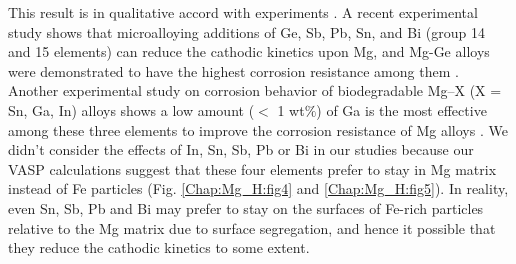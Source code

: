 This result is in qualitative accord with experiments \cite{liu2016controlling,birbilis2014evidence}. A recent experimental study shows that microalloying additions of Ge, Sb, Pb, Sn, and Bi (group 14 and 15 elements) can reduce the cathodic kinetics upon Mg, and Mg-Ge alloys were demonstrated to have the highest corrosion resistance among them \cite{liu2018simultaneously}. Another experimental study on corrosion behavior of biodegradable Mg–X (X = Sn, Ga, In) alloys shows a low amount ($<$ 1 wt$\%$) of Ga is the most effective among these three elements to improve the corrosion resistance of Mg alloys \cite{kubasek2013structure}. We didn't consider the effects of In, Sn, Sb, Pb or Bi in our studies because our \ac{VASP} calculations suggest that these four elements prefer to stay in Mg matrix instead of Fe particles (Fig. \ref{Chap:Mg_H:fig4} and \ref{Chap:Mg_H:fig5}). In reality, even Sn, Sb, Pb and Bi may prefer to stay on the surfaces of Fe-rich particles relative to the Mg matrix due to surface segregation, and hence it possible that they reduce the cathodic kinetics to some extent.

